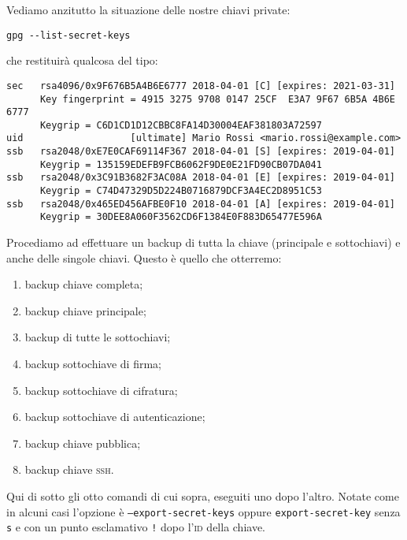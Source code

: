 \documentclass[a4paper,10pt]{article}
\begin{document}
Vediamo anzitutto la situazione delle nostre chiavi private:

\begin{verbatim}
gpg --list-secret-keys
\end{verbatim}

che restituirà qualcosa del tipo:

\begin{verbatim}
sec   rsa4096/0x9F676B5A4B6E6777 2018-04-01 [C] [expires: 2021-03-31]
      Key fingerprint = 4915 3275 9708 0147 25CF  E3A7 9F67 6B5A 4B6E 6777
      Keygrip = C6D1CD1D12CBBC8FA14D30004EAF381803A72597
uid                   [ultimate] Mario Rossi <mario.rossi@example.com>
ssb   rsa2048/0xE7E0CAF69114F367 2018-04-01 [S] [expires: 2019-04-01]
      Keygrip = 135159EDEFB9FCB6062F9DE0E21FD90CB07DA041
ssb   rsa2048/0x3C91B3682F3AC08A 2018-04-01 [E] [expires: 2019-04-01]
      Keygrip = C74D47329D5D224B0716879DCF3A4EC2D8951C53
ssb   rsa2048/0x465ED456AFBE0F10 2018-04-01 [A] [expires: 2019-04-01]
      Keygrip = 30DEE8A060F3562CD6F1384E0F883D65477E596A
\end{verbatim}

Procediamo ad effettuare un backup di tutta la chiave (principale e sottochiavi) e anche delle singole chiavi. Questo è quello che otterremo:

\begin{enumerate}
 \item backup chiave completa;
 \item backup chiave principale;
 \item backup di tutte le sottochiavi;
 \item backup sottochiave di firma;
 \item backup sottochiave di cifratura;
 \item backup sottochiave di autenticazione;
 \item backup chiave pubblica;
 \item backup chiave \textsc{ssh}.
\end{enumerate}


Qui di sotto gli otto comandi di cui sopra, eseguiti uno dopo l'altro. Notate come in alcuni casi l'opzione è \texttt{--export-secret-keys} oppure \texttt{export-secret-key} senza \texttt{s} e con un punto esclamativo \texttt{!} dopo l'\textsc{id} della chiave.
\end{document}
